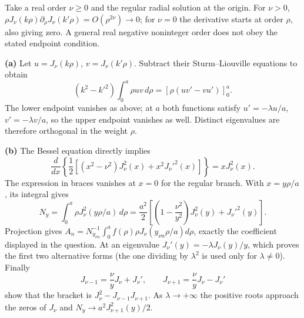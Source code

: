 Take a real order $\nu\geq0$ and the regular radial solution at the
origin.  For $\nu>0$, $\rho J_\nu(k\rho)\partial_\rho
J_\nu(k'\rho)=O(\rho^{2\nu})\to0$; for $\nu=0$ the derivative
starts at order $\rho$, also giving zero.  A general real negative
noninteger order does not obey the stated endpoint condition.

\textbf{(a)} Let $u=J_\nu(k\rho)$, $v=J_\nu(k'\rho)$.
Subtract their Sturm--Liouville equations to obtain
\[
(k^2-k'^2)\int_0^a\rho uv\,d\rho
=[\rho(uv'-vu')]_0^a.
\]
The lower endpoint vanishes as above; at $a$ both functions satisfy
$u'=-\lambda u/a$, $v'=-\lambda v/a$, so the upper endpoint
vanishes as well.  Distinct eigenvalues are therefore orthogonal in
the weight $\rho$.

\textbf{(b)} The Bessel equation directly implies
\[
\frac{d}{dx}\left\{\frac12\left[(x^2-\nu^2)J_\nu^2(x)
+x^2J_\nu'^2(x)\right]\right\}=xJ_\nu^2(x).
\]
The expression in braces vanishes at $x=0$ for the regular branch.
With $x=y\rho/a$, its integral gives
\[
N_y=\int_0^a\rho J_\nu^2(y\rho/a)\,d\rho
=\frac{a^2}{2}\left[
\left(1-\frac{\nu^2}{y^2}\right)J_\nu^2(y)+J_\nu'^2(y)\right].
\]
Projection gives $A_n=N_{y_{\nu n}}^{-1}
\int_0^af(\rho)\rho J_\nu(y_{\nu n}\rho/a)d\rho$, exactly the
coefficient displayed in the question.  At an eigenvalue
$J_\nu'(y)=-\lambda J_\nu(y)/y$, which proves the first two
alternative forms (the one dividing by $\lambda^2$ is used only for
$\lambda\ne0$).  Finally
\[
J_{\nu-1}=\frac\nu yJ_\nu+J_\nu',\qquad
J_{\nu+1}=\frac\nu yJ_\nu-J_\nu'
\]
show that the bracket is $J_\nu^2-J_{\nu-1}J_{\nu+1}$.
As $\lambda\to+\infty$ the positive roots approach the zeros of
$J_\nu$ and $N_y\to a^2J_{\nu+1}^2(y)/2$.

